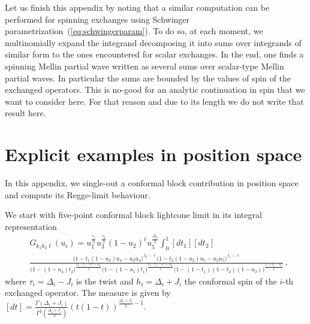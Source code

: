 Let us finish this appendix by noting that a similar computation can be performed for spinning exchanges using Schwinger parametrization~(\ref{eq:schwingerparam}). To do so, at each moment, we multinomially expand the integrand decomposing it into sums over integrands of similar form to the ones encountered for scalar exchanges. In the end, one finds a spinning Mellin partial wave written as several sums over scalar-type Mellin partial waves. In particular the sums are bounded by the values of spin of the exchanged operators. This is no-good for an analytic continuation in spin that we want to consider here. For that reason and due to its length we do not write that result here.

\section{Explicit examples in position space}
In this appendix, we single-out a conformal block contribution in position space and compute its Regge-limit behaviour.

We start with five-point conformal block lightcone limit in its integral representation
\begin{align}
   & G_{k_1k_2\ell}(u_i)= u_1^\frac{\tau_1}{2} u_3^\frac{\tau_2}{2} (1-u_2)^{\ell} u_5^{\frac{\Delta_\phi}{2}} \int_{0}^{1} [dt_1][dt_2]
  \label{eq:5ptlightconeblockdef}                                                                                                                                                                                                                                                                       \\
   & \frac{\big(1-t_1(1-u_2)u_4-u_2u_4\big)^{J_2-\ell}\big(1-t_2(1-u_2)u_5-u_2u_5\big)^{J_1-\ell}}{\big(1-(1-u_4)t_2\big)^{\frac{h_2-\tau_1-2\ell+\Delta_\phi}{2}}\big(1-(1-u_5)t_1\big)^{\frac{h_1-\tau_2-2\ell+\Delta_\phi}{2}} \big(1-(1-t_1)(1-t_2)(1-u_2)\big)^{\frac{h_1+h_2-\Delta_\phi}{2}}}\,,
  \nonumber
\end{align}
where $\tau_i=\Delta_i-J_i$ is the twist and $h_i=\Delta_i+J_i$ the conformal spin of the $i$-th exchanged operator.
The measure is given by $[dt]=\frac{\Gamma(\Delta_i+J_i)}{\Gamma^2(\frac{\Delta_i+J_i}{2})}(t(1-t))^{\frac{\Delta_i+J_i}{2}-1}$.

